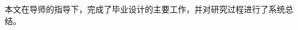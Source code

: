 \documentclass[degree=bachelor, fontset=fandol]{nwputhesis}
\begin{document}
\START
\showoutput

\backmatter

\begin{designsummary}
本文在导师的指导下，完成了毕业设计的主要工作，并对研究过程进行了系统总结。
\end{designsummary}

\clearpage
\OMIT
\end{document}
